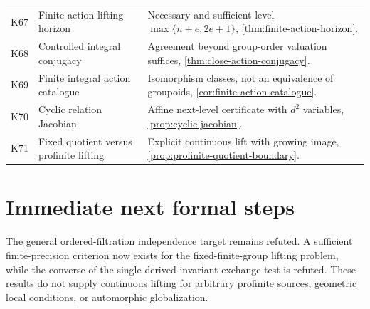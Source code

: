 \documentclass[11pt]{article}
\theoremstyle{definition}
\theoremstyle{remark}
\begin{document}
\begin{longtable}{>{\raggedright\arraybackslash}p{} >{\raggedright\arraybackslash}p{} >{\raggedright\arraybackslash}p{}}
K67 & Finite action-lifting horizon & Necessary and sufficient level $\max\{n+e,2e+1\}$, \cref{thm:finite-action-horizon}.\\
K68 & Controlled integral conjugacy & Agreement beyond group-order valuation suffices, \cref{thm:close-action-conjugacy}.\\
K69 & Finite integral action catalogue & Isomorphism classes, not an equivalence of groupoids, \cref{cor:finite-action-catalogue}.\\
K70 & Cyclic relation Jacobian & Affine next-level certificate with $d^2$ variables, \cref{prop:cyclic-jacobian}.\\
K71 & Fixed quotient versus profinite lifting & Explicit continuous lift with growing image, \cref{prop:profinite-quotient-boundary}.\\
\bottomrule
\end{longtable}

\section{Immediate next formal steps}

The general ordered-filtration independence target remains refuted. A sufficient finite-precision criterion now exists for the fixed-finite-group lifting problem, while the converse of the single derived-invariant exchange test is refuted. These results do not supply continuous lifting for arbitrary profinite sources, geometric local conditions, or automorphic globalization.
\end{document}

